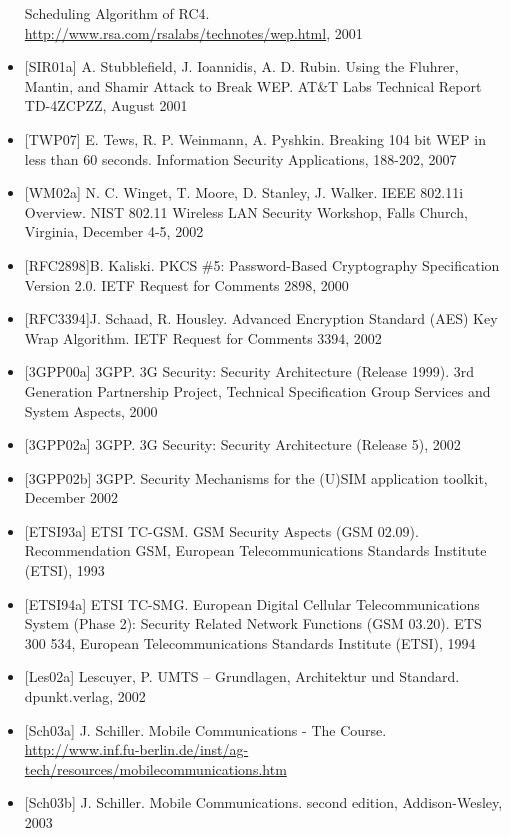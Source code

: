 \documentclass[a4paper]{article}
\begin{document}
\begin{multicols}{3}
\begin{itemize}
              Scheduling Algorithm of RC4.
              \href{http://www.rsa.com/rsalabs/technotes/wep.html}{http://www.rsa.com/rsalabs/technotes/wep.html},
              2001
        \item
              {[}SIR01a{]} A. Stubblefield, J. Ioannidis, A. D. Rubin. Using the
              Fluhrer, Mantin, and Shamir Attack to Break WEP. AT\&T Labs Technical
              Report TD-4ZCPZZ, August 2001
        \item
              {[}TWP07{]} E. Tews, R. P. Weinmann, A. Pyshkin. Breaking 104 bit WEP
              in less than 60 seconds. Information Security Applications, 188-202,
              2007
        \item
              {[}WM02a{]} N. C. Winget, T. Moore, D. Stanley, J. Walker. IEEE
              802.11i Overview. NIST 802.11 Wireless LAN Security Workshop, Falls
              Church, Virginia, December 4-5, 2002
        \item
              {[}RFC2898{]}B. Kaliski. PKCS \#5: Password-Based Cryptography
              Specification Version 2.0. IETF Request for Comments 2898, 2000
        \item
              {[}RFC3394{]}J. Schaad, R. Housley. Advanced Encryption Standard (AES)
              Key Wrap Algorithm. IETF Request for Comments 3394, 2002
        \item
              {[}3GPP00a{]} 3GPP. 3G Security: Security Architecture (Release 1999).
              3rd Generation Partnership Project, Technical Specification Group
              Services and System Aspects, 2000
        \item
              {[}3GPP02a{]} 3GPP. 3G Security: Security Architecture (Release 5),
              2002
        \item
              {[}3GPP02b{]} 3GPP. Security Mechanisms for the (U)SIM application
              toolkit, December 2002
        \item
              {[}ETSI93a{]} ETSI TC-GSM. GSM Security Aspects (GSM 02.09).
              Recommendation GSM, European Telecommunications Standards Institute
              (ETSI), 1993
        \item
              {[}ETSI94a{]} ETSI TC-SMG. European Digital Cellular
              Telecommunications System (Phase 2): Security Related Network
              Functions (GSM 03.20). ETS 300 534, European Telecommunications
              Standards Institute (ETSI), 1994
        \item
              {[}Les02a{]} Lescuyer, P. UMTS -- Grundlagen, Architektur und
              Standard. dpunkt.verlag, 2002
        \item
              {[}Sch03a{]} J. Schiller. Mobile Communications - The Course.
              \href{http://www.inf.fu-berlin.de/inst/ag-tech/resources/mobilecommunications.htm}{http://www.inf.fu-berlin.de/inst/ag-tech/resources/mobilecommunications.htm}
        \item
              {[}Sch03b{]} J. Schiller. Mobile Communications. second edition,
              Addison-Wesley, 2003
    \end{itemize}

\end{multicols}
\end{document}
